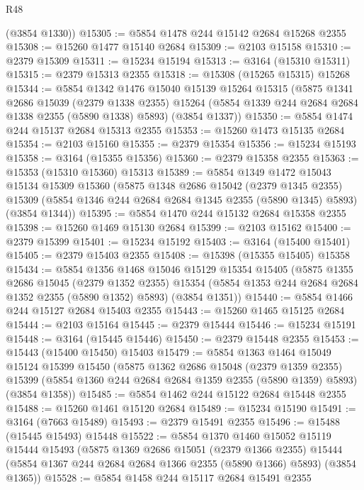 \begin{lexlean}{R48}
\begin{coremodule}
      (@3854 @1330))
@15305 := @5854 @1478 @244 @15142 @2684 @15268 @2355
@15308 := @15260 @1477 @15140 @2684
@15309 := @2103 @15158
@15310 := @2379 @15309
@15311 := @15234 @15194
@15313 := @3164 (@15310 @15311)
@15315 := @2379 @15313 @2355
@15318 := @15308 (@15265 @15315) @15268
@15344 := @5854
    @1342
    @1476
    @15040
    @15139
    @15264
    @15315
    (@5875
      @1341
      @2686
      @15039
      (@2379 @1338 @2355)
      @15264
      (@5854 @1339 @244 @2684 @2684 @1338 @2355 (@5890 @1338) @5893)
      (@3854 @1337))
@15350 := @5854 @1474 @244 @15137 @2684 @15313 @2355
@15353 := @15260 @1473 @15135 @2684
@15354 := @2103 @15160
@15355 := @2379 @15354
@15356 := @15234 @15193
@15358 := @3164 (@15355 @15356)
@15360 := @2379 @15358 @2355
@15363 := @15353 (@15310 @15360) @15313
@15389 := @5854
    @1349
    @1472
    @15043
    @15134
    @15309
    @15360
    (@5875
      @1348
      @2686
      @15042
      (@2379 @1345 @2355)
      @15309
      (@5854 @1346 @244 @2684 @2684 @1345 @2355 (@5890 @1345) @5893)
      (@3854 @1344))
@15395 := @5854 @1470 @244 @15132 @2684 @15358 @2355
@15398 := @15260 @1469 @15130 @2684
@15399 := @2103 @15162
@15400 := @2379 @15399
@15401 := @15234 @15192
@15403 := @3164 (@15400 @15401)
@15405 := @2379 @15403 @2355
@15408 := @15398 (@15355 @15405) @15358
@15434 := @5854
    @1356
    @1468
    @15046
    @15129
    @15354
    @15405
    (@5875
      @1355
      @2686
      @15045
      (@2379 @1352 @2355)
      @15354
      (@5854 @1353 @244 @2684 @2684 @1352 @2355 (@5890 @1352) @5893)
      (@3854 @1351))
@15440 := @5854 @1466 @244 @15127 @2684 @15403 @2355
@15443 := @15260 @1465 @15125 @2684
@15444 := @2103 @15164
@15445 := @2379 @15444
@15446 := @15234 @15191
@15448 := @3164 (@15445 @15446)
@15450 := @2379 @15448 @2355
@15453 := @15443 (@15400 @15450) @15403
@15479 := @5854
    @1363
    @1464
    @15049
    @15124
    @15399
    @15450
    (@5875
      @1362
      @2686
      @15048
      (@2379 @1359 @2355)
      @15399
      (@5854 @1360 @244 @2684 @2684 @1359 @2355 (@5890 @1359) @5893)
      (@3854 @1358))
@15485 := @5854 @1462 @244 @15122 @2684 @15448 @2355
@15488 := @15260 @1461 @15120 @2684
@15489 := @15234 @15190
@15491 := @3164 (@7663 @15489)
@15493 := @2379 @15491 @2355
@15496 := @15488 (@15445 @15493) @15448
@15522 := @5854
    @1370
    @1460
    @15052
    @15119
    @15444
    @15493
    (@5875
      @1369
      @2686
      @15051
      (@2379 @1366 @2355)
      @15444
      (@5854 @1367 @244 @2684 @2684 @1366 @2355 (@5890 @1366) @5893)
      (@3854 @1365))
@15528 := @5854 @1458 @244 @15117 @2684 @15491 @2355

\end{coremodule}
\end{lexlean}
